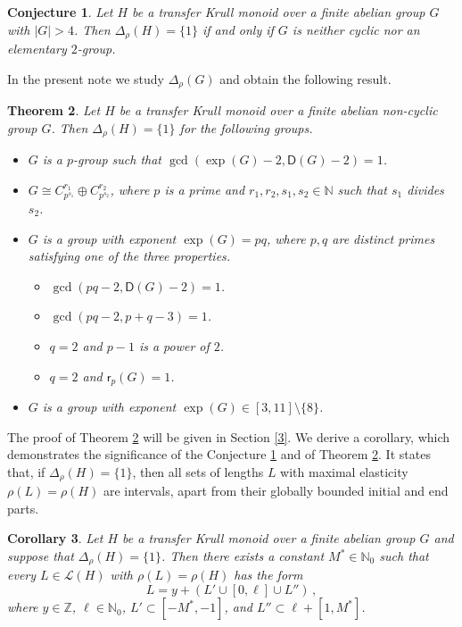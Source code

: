 \documentclass[a4paper,10pt]{amsart}
\theoremstyle{plain}
\newtheorem{theorem}{\bf Theorem}[section]
\newtheorem{corollary}[theorem]{\bf Corollary}
\newtheorem{conjecture}[theorem]{\bf Conjecture}
\theoremstyle{definition}
\newcommand{\N}{\mathbb N}
\newcommand{\Z}{\mathbb Z}
\numberwithin{equation}{section}
\begin{document}
\smallskip
\begin{conjecture} \label{2.1}
Let $H$ be a transfer Krull monoid over a finite abelian group $G$ with $|G| > 4$. Then $\Delta_{\rho} (H)= \{1\}$ if and only if $G$ is neither cyclic nor an elementary $2$-group.
\end{conjecture}

\smallskip
In the present note we study $\Delta_{\rho} (G)$ and obtain the following result.


\smallskip
\begin{theorem} \label{2.2}
Let $H$ be a transfer Krull monoid over a finite abelian non-cyclic group $G$. Then $\Delta_{\rho} (H) = \{1\}$ for the following groups.
\begin{itemize}
	\item[(a)]  $G$ is a $p$-group such that $\gcd (\exp (G)-2, \mathsf D (G)-2)=1$.
	
	\item[(b)]  $G\cong C_{p^{s_1}}^{r_1}\oplus C_{p^{s_2}}^{r_2}$, where $p$ is a prime and $r_1,r_2, s_1, s_2\in \N$ such that $s_1$ divides $s_2$.
	
	\item[(c)] $G$ is a  group with exponent $\exp (G) = pq$, where $p, q$ are distinct primes satisfying one of the three properties.
	\begin{itemize}
		\item[(i)] $\gcd ( pq-2, \mathsf D (G)-2 ) = 1$.
		\item[(ii)] $\gcd(pq - 2, p+q-3)=1$.
		\item[(iii)] $q=2$ and $p-1$ is a power of $2$.
		\item[(iv)] $q=2$ and $\mathsf r_p (G) = 1$.
	\end{itemize}
	
	
	\item[(d)]  $G$ is a  group with exponent $\exp (G) \in [3,11]\setminus \{8\}$.
\end{itemize}

\end{theorem}

The proof of Theorem \ref{2.2} will be given in Section \ref{3}. We derive  a corollary, which demonstrates the significance of the Conjecture \ref{2.1} and of Theorem \ref{2.2}. It states that, if $\Delta_{\rho} (H) = \{1\}$, then all sets of lengths $L$ with maximal elasticity $\rho (L) = \rho (H)$ are intervals, apart from their globally bounded initial and end parts.

\smallskip
\begin{corollary} \label{2.3}
Let $H$ be a transfer Krull monoid over a finite abelian group $G$ and suppose that $\Delta_{\rho} (H) = \{1\}$. Then there exists a constant $M^* \in \N_0$ such that every $L \in \mathcal L (H)$ with $\rho (L)= \rho (H)$ has the form
\[
L = y + (L' \cup [0, \ell]  \cup L'')  \,,
\]
where $y \in \Z$, $\ell \in \N_0$, $L' \subset [-M^*,-1]$, and $L'' \subset \ell  + [1, M^*]$.
\end{corollary}
\end{document}
